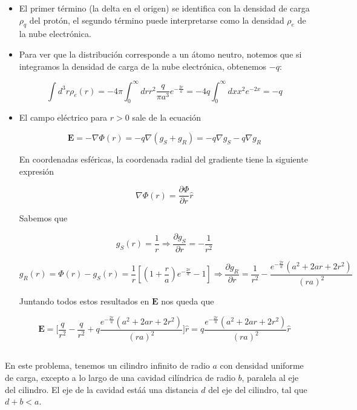 \begin{itemize}
    \item El primer t\'ermino (la delta en el origen) se identifica con la densidad de carga $\rho_{q}$ del prot\'on, el segundo t\'ermino puede interpretarse como la densidad $\rho_{e}$ de la nube electr\'onica.

    \item Para ver que la distribuci\'on corresponde a un \'atomo neutro, notemos que si integramos la densidad de carga de la nube electr\'onica, obtenemos $-q$:

    $$\int d^{3}r \rho_{e}(r) = -4\pi \int_{0}^{\infty}dr r^{2} \frac{q}{\pi a^{3}}e^{-\frac{2r}{a}} = -4q \int_{0}^{\infty} dx x^{2} e^{-2x} = -q$$

    \item El campo el\'ectrico para $r > 0$ sale de la ecuaci\'on

    $$\mathbf{E} = -\nabla \Phi(r) = -q\nabla(g_{S} + g_{R}) = -q\nabla g_{S} - q\nabla g_{R}$$

    En coordenadas esf\'ericas, la coordenada radial del gradiente tiene la siguiente expresi\'on

    $$\nabla \Phi(r) = \frac{\partial \Phi}{\partial r}\hat{r}$$

    Sabemos que
    
    $$g_{S}(r) = \frac{1}{r} \Rightarrow \frac{\partial g_{S}}{\partial r} = -\frac{1}{r^{2}}$$

    $$g_{R}(r) = \Phi(r) - g_{S}(r) = \frac{1}{r}[(1 + \frac{r}{a})e^{-\frac{2r}{a}} - 1] \Rightarrow \frac{\partial g_{R}}{\partial r} = \frac{1}{r^{2}} - \frac{e^{-\frac{2r}{a}}(a^{2} + 2ar + 2r^{2})}{(ra)^{2}}$$

    Juntando todos estos resultados en $\mathbf{E}$ nos queda que

    $$\mathbf{E} = \bigg[\frac{q}{r^{2}} - \frac{q}{r^{2}} + q\frac{e^{-\frac{2r}{a}}(a^{2} + 2ar + 2r^{2})}{(ra)^{2}}\bigg]\hat{r} = q\frac{e^{-\frac{2r}{a}}(a^{2} + 2ar + 2r^{2})}{(ra)^{2}}\hat{r}$$
    
\end{itemize}

\subsection{}

En este problema, tenemos un cilindro infinito de radio $a$ con densidad uniforme de carga, excepto a lo largo de una cavidad cil\'indrica de radio $b$, paralela al eje del cilindro. El eje de la cavidad está\'a una distancia $d$ del eje del cilindro, tal que $d + b < a$. \newline

